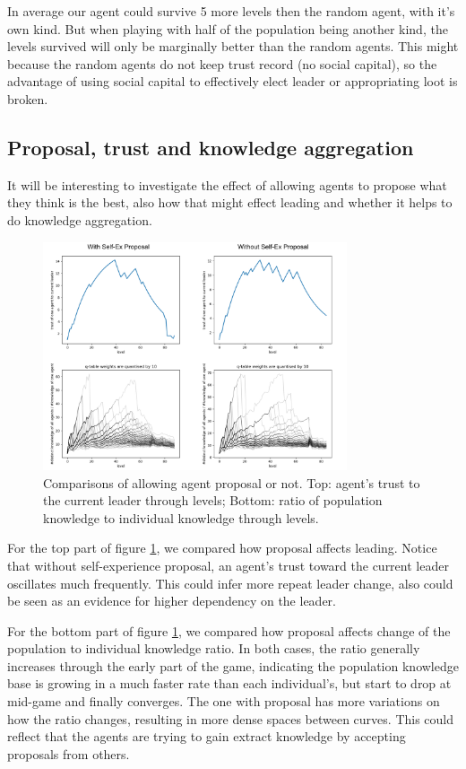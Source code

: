 In average our agent could survive 5 more levels then the random agent, with it's own kind. But when playing with half of the population being another kind, the levels survived will only be marginally better than the random agents. This might because the random agents do not keep trust record (no social capital), so the advantage of using social capital to effectively elect leader or appropriating loot is broken.

\subsection{Proposal, trust and knowledge aggregation}
It will be interesting to investigate the effect of allowing agents to propose what they think is the best, also how that might effect leading and whether it helps to do knowledge aggregation.

\begin{figure}[!ht]
    \centering
    \includegraphics[width=0.8\textwidth]{008_team_5_agent_design/images/knowledgeAgg.png}
    \caption{Comparisons of allowing agent proposal or not. Top: agent's trust to the current leader through levels; Bottom: ratio of population knowledge to individual knowledge through levels.}
    \label{fig:knowledgeAgg}
\end{figure}

For the top part of figure \ref{fig:knowledgeAgg}, we compared how proposal affects leading. Notice that without self-experience proposal, an agent's trust toward the current leader oscillates much frequently. This could infer more repeat leader change, also could be seen as an evidence for higher dependency on the leader.

For the bottom part of figure \ref{fig:knowledgeAgg}, we compared how proposal affects change of the population to individual knowledge ratio. In both cases, the ratio generally increases through the early part of the game, indicating the population knowledge base is growing in a much faster rate than each individual's, but start to drop at mid-game and finally converges. The one with proposal has more variations on how the ratio changes, resulting in more dense spaces between curves. This could reflect that the agents are trying to gain extract knowledge by accepting proposals from others.
